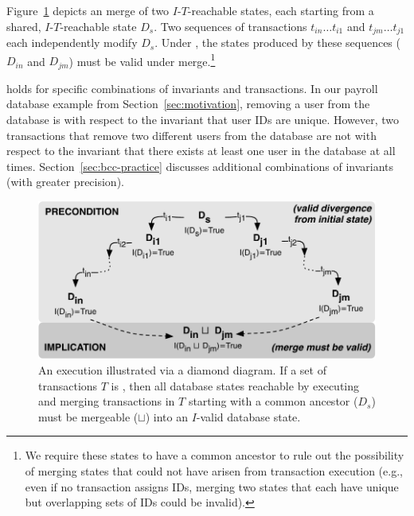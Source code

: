 Figure~\ref{fig:iconfluence} depicts an \iconfluent merge of
two $I$-$T$-reachable states, each starting from a shared,
$I$-$T$-reachable state $D_s$. Two sequences of transactions
$t_{in}\dots t_{i1}$ and $t_{jm}\dots t_{j1}$ each independently
modify $D_s$. Under \iconfluence, the states produced by these
sequences ($D_{in}$ and $D_{jm}$) must be valid under
merge.\footnote{We require these states to have a common
  ancestor to rule out the possibility of merging states that could
  not have arisen from transaction execution (e.g., even if no
  transaction assigns IDs, merging two states that each have unique
  but overlapping sets of IDs could be invalid).}

\iconfluence holds for specific combinations of invariants and
transactions. In our payroll database example from
Section~\ref{sec:motivation}, removing a user from the database is
\iconfluent with respect to the invariant that user IDs are
unique. However, two transactions that remove two different users from
the database are not \iconfluent with respect to the invariant that
there exists at least one user in the database at all
times. Section~\ref{sec:bcc-practice} discusses additional
combinations of invariants (with greater precision).

\begin{figure}
\begin{center}
\includegraphics[width=\columnwidth]{figs/icommute.pdf}\vspace{-1em}
\end{center}
\caption{An \iconfluent execution illustrated via a diamond
  diagram. If a set of transactions $T$ is \iconfluent, then all
  database states reachable by executing and merging transactions in
  $T$ starting with a common ancestor ($D_s$) must
  be mergeable ($\sqcup$) into an $I$-valid database state.}
\label{fig:iconfluence}
\end{figure}

